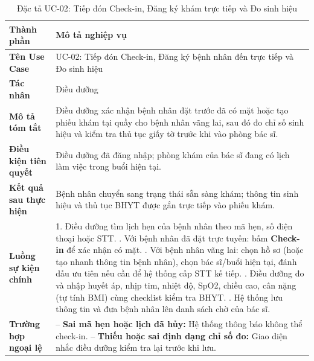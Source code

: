 \documentclass[12pt,a4paper]{report}
\begin{document}
\begin{table}[H]
  \centering
  \caption{Đặc tả UC-02: Tiếp đón Check-in, Đăng ký khám trực tiếp và Đo sinh hiệu}
  \begin{tabularx}{\textwidth}{@{}l X@{}}
    \toprule
    \textbf{Thành phần} & \textbf{Mô tả nghiệp vụ} \\
    \midrule
    \textbf{Tên Use Case} & UC-02: Tiếp đón Check-in, Đăng ký bệnh nhân đến trực tiếp và Đo sinh hiệu \\
    \textbf{Tác nhân} & Điều dưỡng \\
    \textbf{Mô tả tóm tắt} & Điều dưỡng xác nhận bệnh nhân đặt trước đã có mặt hoặc tạo phiếu khám tại quầy cho bệnh nhân vãng lai, sau đó đo chỉ số sinh hiệu và kiểm tra thủ tục giấy tờ trước khi vào phòng bác sĩ. \\
    \textbf{Điều kiện tiên quyết} & Điều dưỡng đã đăng nhập; phòng khám của bác sĩ đang có lịch làm việc trong buổi hiện tại. \\
    \textbf{Kết quả sau thực hiện} & Bệnh nhân chuyển sang trạng thái sẵn sàng khám; thông tin sinh hiệu và thủ tục BHYT được gắn trực tiếp vào phiếu khám. \\
    \textbf{Luồng sự kiện chính} &
      1. Điều dưỡng tìm lịch hẹn của bệnh nhân theo mã hẹn, số điện thoại hoặc STT. \newline
      2. Với bệnh nhân đã đặt trực tuyến: bấm \textbf{Check-in} để xác nhận có mặt. \newline
      3. Với bệnh nhân vãng lai: chọn hồ sơ (hoặc tạo nhanh thông tin bệnh nhân), chọn bác sĩ/buổi hiện tại, đánh dấu ưu tiên nếu cần để hệ thống cấp STT kế tiếp. \newline
      4. Điều dưỡng đo và nhập huyết áp, nhịp tim, nhiệt độ, SpO2, chiều cao, cân nặng (tự tính BMI) cùng checklist kiểm tra BHYT. \newline
      5. Hệ thống lưu thông tin và đưa bệnh nhân lên danh sách chờ của bác sĩ. \\
    \textbf{Trường hợp ngoại lệ} &
      -- \textbf{Sai mã hẹn hoặc lịch đã hủy:} Hệ thống thông báo không thể check-in. \newline
      -- \textbf{Thiếu hoặc sai định dạng chỉ số đo:} Giao diện nhắc điều dưỡng kiểm tra lại trước khi lưu. \\
    \bottomrule
  \end{tabularx}
\end{table}
\end{document}
